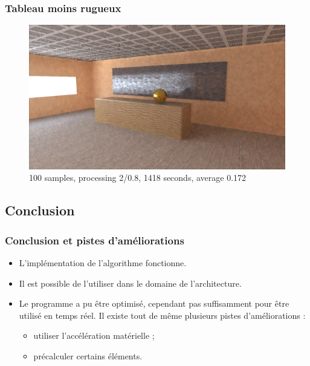 \documentclass[handout]{beamer}
\begin{document}
\begin{frame}
    \frametitle{Tableau moins rugueux}

    \begin{figure}
        \includegraphics[scale=0.25]{tableau.png}
        \caption{100 samples, processing 2/0.8, 1418 seconds, average 0.172}
    \end{figure}

\end{frame}

\subsection{Conclusion}

\begin{frame}
    \frametitle{Conclusion et pistes d'améliorations}

    \begin{itemize}
        \item L'implémentation de l'algorithme fonctionne.
        \item Il est possible de l'utiliser dans le domaine de l'architecture.
        \item
            Le programme a pu être optimisé, cependant pas suffisamment pour être utilisé en temps réel.
            Il existe tout de même plusieurs pistes d'améliorations :
            \begin{itemize}
                \item utiliser l'accélération matérielle ;
                \item précalculer certains éléments.
            \end{itemize}
    \end{itemize}

\end{frame}
\end{document}
